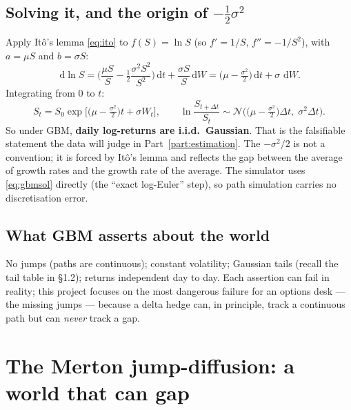 \documentclass[11pt,a4paper]{article}
\newcommand{\dd}{\,\mathrm{d}}
\newcommand{\N}{\mathcal{N}}
\begin{document}
\subsection{Solving it, and the origin of \texorpdfstring{$-\tfrac12\sigma^2$}{-sigma\texttwosuperior/2}}
Apply It\^o's lemma \eqref{eq:ito} to $f(S)=\ln S$ (so $f'=1/S$,
$f''=-1/S^2$), with $a=\mu S$ and $b=\sigma S$:
\begin{equation}
\dd \ln S=\Big(\frac{\mu S}{S}-\tfrac12\frac{\sigma^2S^2}{S^2}\Big)\dd t
+\frac{\sigma S}{S}\dd W
=\Big(\mu-\tfrac{\sigma^2}{2}\Big)\dd t+\sigma\,\dd W .
\end{equation}
Integrating from 0 to $t$:
\begin{equation}
S_t=S_0\exp\!\Big[\big(\mu-\tfrac{\sigma^2}{2}\big)t+\sigma W_t\Big],
\qquad
\ln\frac{S_{t+\Delta t}}{S_t}\sim
\N\!\Big(\big(\mu-\tfrac{\sigma^2}{2}\big)\Delta t,\;\sigma^2\Delta t\Big).
\label{eq:gbmsol}
\end{equation}
So under GBM, \textbf{daily log-returns are i.i.d.\ Gaussian}. That is the
falsifiable statement the data will judge in Part~\ref{part:estimation}. The
$-\sigma^2/2$ is not a convention; it is forced by It\^o's lemma and reflects
the gap between the average of growth rates and the growth rate of the average.
The simulator uses \eqref{eq:gbmsol} directly (the ``exact log-Euler'' step), so
path simulation carries no discretisation error.

\subsection{What GBM asserts about the world}
No jumps (paths are continuous); constant volatility; Gaussian tails (recall the
tail table in \S1.2); returns independent day to day. Each assertion can fail in
reality; this project focuses on the most dangerous failure for an options desk
--- the missing jumps --- because a delta hedge can, in principle, track a
continuous path but can \emph{never} track a gap.

\section{The Merton jump-diffusion: a world that can gap}
\label{sec:merton}
\end{document}
